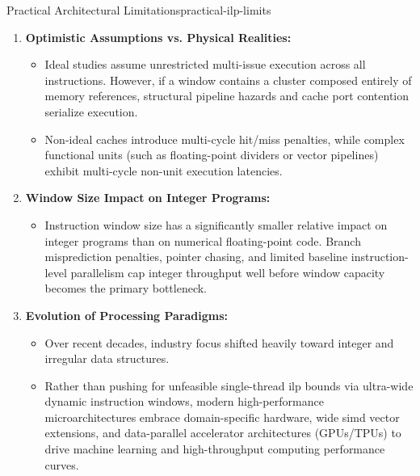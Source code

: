 \begin{concept}{Practical Architectural Limitations}{practical-ilp-limits}
\begin{enumerate}
    \item \textbf{Optimistic Assumptions vs. Physical Realities:}
    \begin{itemize}
        \item Ideal studies assume unrestricted multi-issue execution across all instructions. However, if a window contains a cluster composed entirely of memory references, structural pipeline hazards and cache port contention serialize execution.
        \item Non-ideal caches introduce multi-cycle hit/miss penalties, while complex functional units (such as floating-point dividers or vector pipelines) exhibit multi-cycle non-unit execution latencies.
    \end{itemize}
    \item \textbf{Window Size Impact on Integer Programs:}
    \begin{itemize}
        \item Instruction window size has a significantly smaller relative impact on integer programs than on numerical floating-point code. Branch misprediction penalties, pointer chasing, and limited baseline instruction-level parallelism cap integer throughput well before window capacity becomes the primary bottleneck.
    \end{itemize}
    \item \textbf{Evolution of Processing Paradigms:}
    \begin{itemize}
        \item Over recent decades, industry focus shifted heavily toward integer and irregular data structures.
        \item Rather than pushing for unfeasible single-thread \gls{ilp} bounds via ultra-wide dynamic instruction windows, modern high-performance microarchitectures embrace domain-specific hardware, wide \gls{simd} vector extensions, and data-parallel accelerator architectures (GPUs/TPUs) to drive machine learning and high-throughput computing performance curves.
    \end{itemize}
\end{enumerate}
\end{concept}